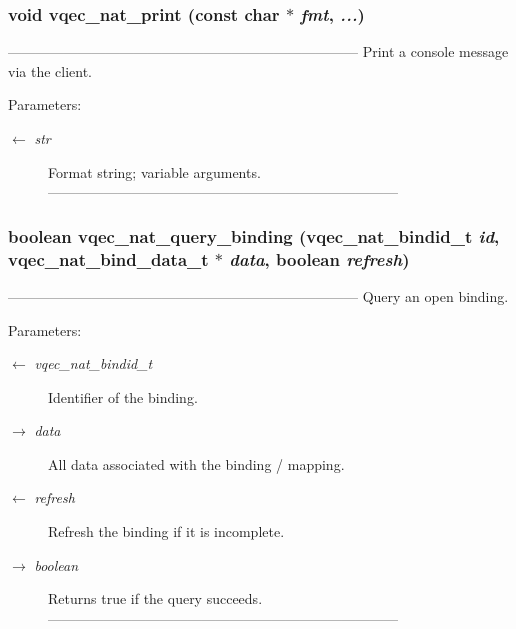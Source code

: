 \subsubsection{\setlength{\rightskip}{0pt plus 5cm}void vqec\_\-nat\_\-print (const char $\ast$ {\em fmt},  {\em ...})}\label{vqec__nat__api_8c_242d3fb466cdea27b1a8f0d8195c785a}


--------------------------------------------------------------------------- Print a console message via the client.

\begin{Desc}
\item[Parameters:]
\begin{description}
\item[\mbox{$\leftarrow$} {\em str}]Format string; variable arguments. --------------------------------------------------------------------------- \end{description}
\end{Desc}
\subsubsection{\setlength{\rightskip}{0pt plus 5cm}boolean vqec\_\-nat\_\-query\_\-binding (vqec\_\-nat\_\-bindid\_\-t {\em id}, vqec\_\-nat\_\-bind\_\-data\_\-t $\ast$ {\em data}, boolean {\em refresh})}\label{vqec__nat__api_8c_11f5bd7a7ac577f32a1e90a2da0c78a2}


--------------------------------------------------------------------------- Query an open binding.

\begin{Desc}
\item[Parameters:]
\begin{description}
\item[\mbox{$\leftarrow$} {\em vqec\_\-nat\_\-bindid\_\-t}]Identifier of the binding. \item[\mbox{$\rightarrow$} {\em data}]All data associated with the binding / mapping. \item[\mbox{$\leftarrow$} {\em refresh}]Refresh the binding if it is incomplete. \item[\mbox{$\rightarrow$} {\em boolean}]Returns true if the query succeeds. --------------------------------------------------------------------------- \end{description}
\end{Desc}
